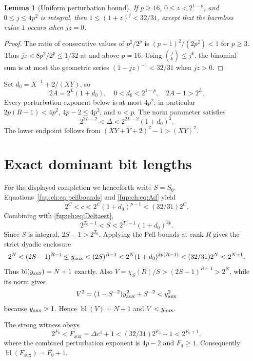 \documentclass[11pt,letterpaper]{article}
\newtheorem{lemma}[theorem]{Lemma}
\theoremstyle{definition}\newtheorem{definition}[theorem]{Definition}
\theoremstyle{remark}\newtheorem{remark}[theorem]{Remark}
\newcommand{\D}{\Delta}
\newcommand{\Fa}{F_{\mathrm{aux}}}\newcommand{\Ua}{U_{\mathrm{aux}}}\newcommand{\ttt}{t_{\mathrm{tr}}}
\newcommand{\bl}{\operatorname{bl}}
\begin{document}
\begin{lemma}[Uniform perturbation bound]\label{fup:eh:lem:budget}
If $p\ge16$, $0\le z<2^{1-p}$, and $0\le j\le4p^2$ is integral,
then $1\le(1+z)^j<32/31$, except that the harmless value $1$ occurs
when $jz=0$.
\end{lemma}
\begin{proof}
The ratio of consecutive values of $p^2/2^p$ is
$(p+1)^2/(2p^2)<1$ for $p\ge3$. Thus
$jz<8p^2/2^p\le1/32$ at and above $p=16$.
Using $\binom jk\le j^k$, the binomial sum is at most the
geometric series $(1-jz)^{-1}<32/31$ when $jz>0$.
\end{proof}

Set $d_0=X^{-1}+2/(XY)$, so
\begin{equation}\label{fup:eh:eq:Ad}
 2A=2^L(1+d_0),\quad 0<d_0<2^{1-p},\quad 2A-1>2^L.
\end{equation}
Every perturbation exponent below is at most $4p^2$; in particular
$2p(R-1)<4p^2$, $4p-2\le4p^2$, and $n<p$.
The norm parameter satisfies
\begin{equation}\label{fup:eh:eq:Deltaest}
 2^{2L-2}<\D<2^{2L-2}(1+d_0)^2.
\end{equation}
The lower endpoint follows from
$(XY+Y+2)^2-1>(XY)^2$.

\section{Exact dominant bit lengths}
\label{fup:eh:sec:dominant}
For the displayed completion we henceforth write $S=S_0$.
Equations~\eqref{fup:eh:eq:pellbounds} and \eqref{fup:eh:eq:Ad} yield
\begin{equation}\label{fup:eh:eq:cest}
 2^C<c<2^C(1+d_0)^{p-1}<(32/31)2^C.
\end{equation}
Combining with \eqref{fup:eh:eq:Deltaest},
\begin{equation}\label{fup:eh:eq:Sest}
 2^{T_0-1}<S<2^{T_0-1}(1+d_0)^{2p}.
\end{equation}
Since $S$ is integral, $2S-1>2^{T_0}$. Applying the Pell bounds
at rank $R$ gives the strict dyadic enclosure
\begin{equation}\label{fup:eh:eq:ybound}
 2^N<(2S-1)^{R-1}\le y_{\mathrm{aux}}<(2S)^{R-1}
 <2^N(1+d_0)^{2p(R-1)}<(32/31)2^N<2^{N+1}.
\end{equation}
Thus $\bl(\yaux)=N+1$ exactly. Also
$V=\chi_S(R)/S>(2S-1)^{R-1}>2^N$, while its norm gives
\[
 V^2=(1-S^{-2})y_{\mathrm{aux}}^2+S^{-2}<y_{\mathrm{aux}}^2
\]
because $y_{\mathrm{aux}}>1$. Hence $\bl(V)=N+1$ and $V<y_{\mathrm{aux}}$.

The strong witness obeys
\[
 2^{F_0}<\Fa=\D c^4+1<(32/31)2^{F_0}+1<2^{F_0+1},
\]
where the combined perturbation exponent is $4p-2$ and $F_0\ge1$.
Consequently $\bl(\Fa)=F_0+1$.
\end{document}

